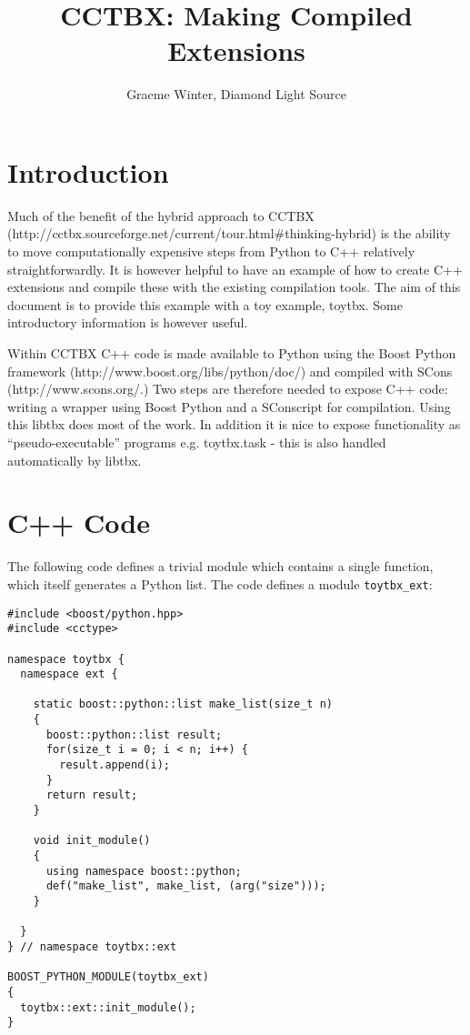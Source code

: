 \documentclass[a4paper, 11pt]{article}
\title{CCTBX: Making Compiled Extensions}
\author{Graeme Winter, Diamond Light Source}
\begin{document}
\maketitle

\section{Introduction}

Much of the benefit of the hybrid approach to CCTBX (http://cctbx.sourceforge.net/current/tour.html\#thinking-hybrid) is the ability to move computationally expensive steps from Python to C++ relatively straightforwardly. It is however helpful to have an example of how to create C++ extensions and compile these with the existing compilation tools. The aim of this document is to provide this example with a toy example, toytbx. Some introductory information is however useful.

Within CCTBX C++ code is made available to Python using the Boost Python framework (http://www.boost.org/libs/python/doc/) and compiled with SCons (http://www.scons.org/.) Two steps are therefore needed to expose C++ code: writing a wrapper using Boost Python and a SConscript for compilation. Using this libtbx does most of the work. In addition it is nice to expose functionality as ``pseudo-executable'' programs e.g. toytbx.task - this is also handled automatically by libtbx.

\section{C++ Code}

The following code defines a trivial module which contains a single function, which itself generates a Python list. The code defines a module \verb|toytbx_ext|:

{\small
\begin{verbatim}
#include <boost/python.hpp>
#include <cctype>

namespace toytbx { 
  namespace ext {

    static boost::python::list make_list(size_t n)
    {
      boost::python::list result;
      for(size_t i = 0; i < n; i++) {
        result.append(i);
      }
      return result;
    }

    void init_module()
    {
      using namespace boost::python;
      def("make_list", make_list, (arg("size")));
    }

  }
} // namespace toytbx::ext

BOOST_PYTHON_MODULE(toytbx_ext)
{
  toytbx::ext::init_module();
}
\end{verbatim}
}
\end{document}
